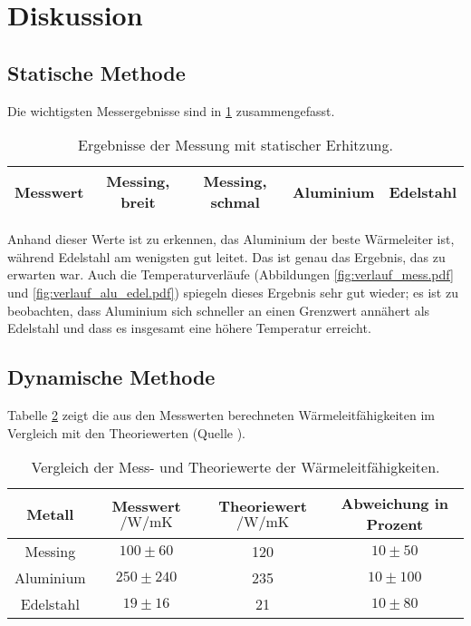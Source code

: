 \section{Diskussion}
\label{sec:Diskussion}

\subsection{Statische Methode}
Die wichtigsten Messergebnisse sind in \ref{tab:pieceofshit} zusammengefasst.

\begin{table}
    \centering
    \caption{Ergebnisse der Messung mit statischer Erhitzung.}
    \label{tab:pieceofshit}
    \begin{tabular}{c c c c c}
        \toprule
        Messwert & Messing, breit & Messing, schmal & Aluminium & Edelstahl \\
        \midrule
        \bottomrule
    \end{tabular}
\end{table}%

\noindent Anhand dieser Werte ist zu erkennen, das Aluminium der beste Wärmeleiter ist, während Edelstahl am wenigsten gut leitet. Das ist genau das Ergebnis, das zu erwarten war.
Auch die Temperaturverläufe (Abbildungen \ref{fig:verlauf_mess.pdf} und \ref{fig:verlauf_alu_edel.pdf}) 
spiegeln dieses Ergebnis sehr gut wieder; es ist zu beobachten, dass Aluminium sich schneller an einen Grenzwert annähert als Edelstahl und dass es 
insgesamt eine höhere Temperatur erreicht. 

\subsection{Dynamische Methode}
Tabelle \ref{tab:vergleich} zeigt die aus den Messwerten berechneten Wärmeleitfähigkeiten im Vergleich mit den Theoriewerten (Quelle \cite{litval}).
\begin{table}
    \centering
    \caption{Vergleich der Mess- und Theoriewerte der Wärmeleitfähigkeiten.}
    \label{tab:vergleich}
    \begin{tabular}{c c c c}
        \toprule
        Metall & Messwert$\mathbin{/} \si{\watt\per\m\kelvin}$ & Theoriewert$\mathbin{/} \si{\watt\per\m\kelvin}$ & Abweichung in Prozent \\
        \midrule
        Messing & $100 \pm 60 $ & 120 & $10 \pm 50$\\
        Aluminium & $250 \pm 240$ & 235 & $10 \pm 100$\\
        Edelstahl & $19 \pm 16$& 21 & $10 \pm 80$\\
        \bottomrule
    \end{tabular}
\end{table}

